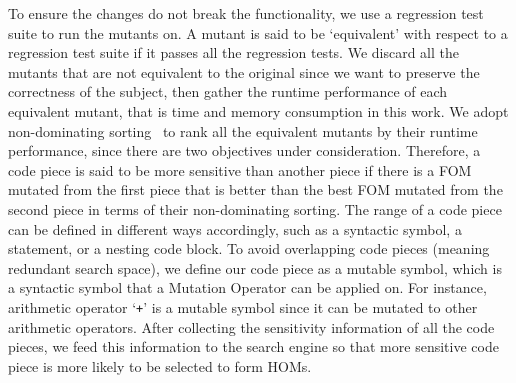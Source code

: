 \documentclass[oribibl]{llncs}
\begin{document}
To ensure the changes do not break the functionality, we use a regression test suite to run the mutants on.
A mutant is said to be `equivalent' with respect to a regression test suite if it passes all the regression tests.
We discard all the mutants that are not equivalent to the original since we want to preserve the correctness of the subject, then gather the runtime performance of each equivalent mutant, that is time and memory consumption in this work.
We adopt non-dominating sorting~\cite{996017} to rank all the equivalent mutants by their runtime performance, since there are two objectives under consideration.
Therefore, a code piece is said to be more sensitive than another piece if there is a FOM mutated from the first piece that is better than the best FOM mutated from the second piece in terms of their non-dominating sorting.
The range of a code piece can be defined in different ways accordingly, such as a syntactic symbol, a statement, or a nesting code block.
To avoid overlapping code pieces (meaning redundant search space), we define our code piece as a mutable symbol, which is a syntactic symbol that a Mutation Operator can be applied on.
For instance, arithmetic operator `\texttt{+}' is a mutable symbol since it can be mutated to other arithmetic operators.
After collecting the sensitivity information of all the code pieces, we feed this information to the search engine so that more sensitive code piece is more likely to be selected to form HOMs.
\end{document}
